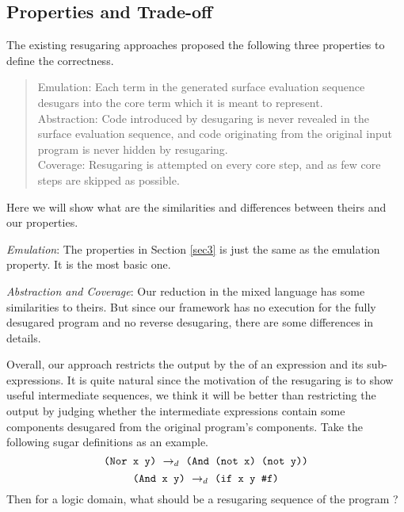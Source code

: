 \subsection{Properties and Trade-off}
\label{mark:correctness}

The existing resugaring approaches \cite{resugaring,hygienic} proposed the following three properties to define the correctness.

\begin{quote}
Emulation:
Each term in the generated surface evaluation sequence desugars into the core term which it is meant to represent.\\
Abstraction:
Code introduced by desugaring is never revealed in the surface evaluation sequence, and code originating from the original input program is never hidden by resugaring.\\
Coverage: Resugaring is attempted on every core step, and as few core steps are skipped as possible.\\
\end{quote}
Here we will show what are the similarities and differences between theirs and our properties.

\emph{Emulation}: The properties in Section \ref{sec3} is just the same as the emulation property. It is the most basic one.

\emph{Abstraction and Coverage}: Our reduction in the mixed language has some similarities to theirs. But since our framework has no execution for the fully desugared program and no reverse desugaring, there are some differences in details.

Overall, our approach restricts the output by the  of an expression and its sub-expressions. It is quite natural since the motivation of the resugaring is to show useful intermediate sequences, we think it will be better than restricting the output by judging whether the intermediate expressions contain some components desugared from the original program's components. Take the following sugar definitions as an example.
\[
\texttt{(Nor~x~y)} ~\rightarrow_d~ \texttt{(And~(not~x)~(not~y))}
\]
\[
\texttt{(And~x~y)} ~\rightarrow_d~ \texttt{(if~x~y~\#f)}
\]
Then for a logic domain, what should be a resugaring sequence of the program  ?


